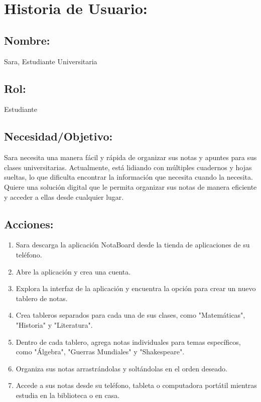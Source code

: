 \section*{Historia de Usuario:}

\subsection*{Nombre:} 
Sara, Estudiante Universitaria

\subsection*{Rol:} 
Estudiante

\subsection*{Necesidad/Objetivo:}
Sara necesita una manera fácil y rápida de organizar sus notas y apuntes para sus clases universitarias. Actualmente, está lidiando con múltiples cuadernos y hojas sueltas, lo que dificulta encontrar la información que necesita cuando la necesita. Quiere una solución digital que le permita organizar sus notas de manera eficiente y acceder a ellas desde cualquier lugar.

\subsection*{Acciones:}
\begin{enumerate}[label=\arabic*.]
    \item Sara descarga la aplicación NotaBoard desde la tienda de aplicaciones de su teléfono.
    \item Abre la aplicación y crea una cuenta.
    \item Explora la interfaz de la aplicación y encuentra la opción para crear un nuevo tablero de notas.
    \item Crea tableros separados para cada una de sus clases, como "Matemáticas", "Historia" y "Literatura".
    \item Dentro de cada tablero, agrega notas individuales para temas específicos, como "Álgebra", "Guerras Mundiales" y "Shakespeare".
    \item Organiza sus notas arrastrándolas y soltándolas en el orden deseado.
    \item Accede a sus notas desde su teléfono, tableta o computadora portátil mientras estudia en la biblioteca o en casa.
\end{enumerate}

